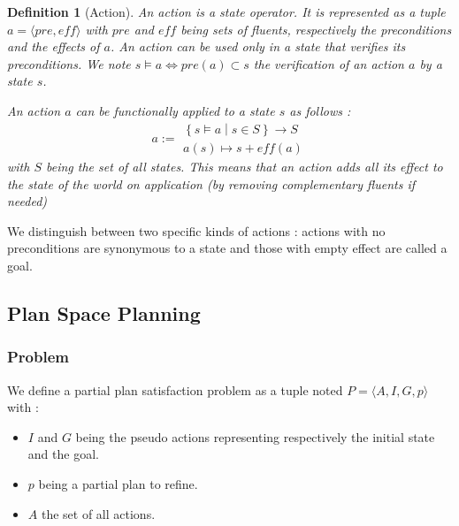\documentclass[]{article}
\providecommand{\tightlist}{%
  \setlength{\itemsep}{0pt}\setlength{\parskip}{0pt}}
\newtheorem{definition}{Definition}
\begin{document}
\begin{definition}[Action]

An action is a state operator. It is represented as a tuple
\(a = \langle pre, eff \rangle\) with \(pre\) and \(eff\) being sets of
fluents, respectively the preconditions and the effects of \(a\). An
action can be used only in a state that verifies its preconditions. We
note \(s \models a \Leftrightarrow pre(a) \subset s\) the verification
of an action \(a\) by a state \(s\).

An action \(a\) can be functionally applied to a state \(s\) as follows
: \[a:= \substack{ \left\{ s \models a \middle| s \in S\right\} \to S\\
    a(s) \mapsto s + eff(a)}\] with \(S\) being the set of all states.
This means that an action adds all its effect to the state of the world
on application (by removing complementary fluents if needed)

\end{definition}

We distinguish between two specific kinds of actions : actions with no
preconditions are synonymous to a state and those with empty effect are
called a goal.

\subsection{Plan Space Planning}\label{plan-space-planning}

\subsubsection{Problem}\label{problem}

We define a partial plan satisfaction problem as a tuple noted
\(P = \langle A, I, G, p \rangle\) with :

\begin{itemize}
\tightlist
\item
  \(I\) and \(G\) being the pseudo actions representing respectively the
  initial state and the goal.
\item
  \(p\) being a partial plan to refine.
\item
  \(A\) the set of all actions.
\end{itemize}
\end{document}

